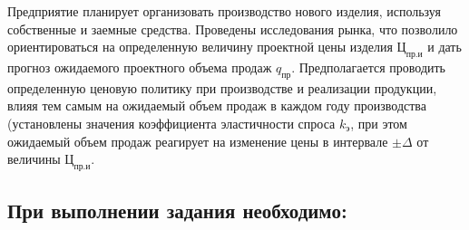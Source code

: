 
Предприятие планирует организовать производство нового изделия, используя
собственные и заемные средства. Проведены исследования рынка, что позволило
ориентироваться на определенную величину проектной цены изделия $\text{Ц}_{\text{пр.и}}$
и дать прогноз ожидаемого проектного объема продаж $q_{\text{пр}}$. Предполагается
проводить определенную ценовую политику при производстве и реализации продукции,
влияя тем самым на ожидаемый объем продаж в каждом году производства (установлены
значения коэффициента эластичности спроса $k_{\text{э}}$, при этом ожидаемый объем
продаж реагирует на изменение цены в интервале $\pm \Delta$ от величины
$\text{Ц}_{\text{пр.и}}$.

\subsection*{При выполнении задания необходимо:}

